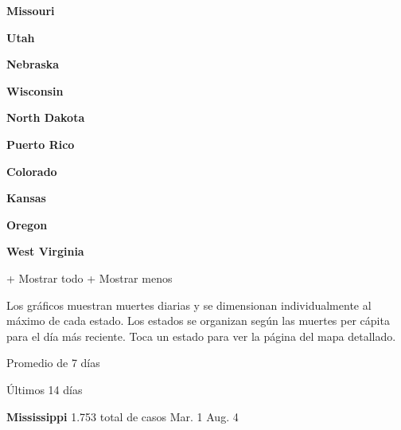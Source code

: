 \href{https://www.nytimes3xbfgragh.onion/interactive/2020/us/missouri-coronavirus-cases.html}{}

\textbf{Missouri}

\href{https://www.nytimes3xbfgragh.onion/interactive/2020/us/utah-coronavirus-cases.html}{}

\textbf{Utah}

\href{https://www.nytimes3xbfgragh.onion/interactive/2020/us/nebraska-coronavirus-cases.html}{}

\textbf{Nebraska}

\href{https://www.nytimes3xbfgragh.onion/interactive/2020/us/wisconsin-coronavirus-cases.html}{}

\textbf{Wisconsin}

\href{https://www.nytimes3xbfgragh.onion/interactive/2020/us/north-dakota-coronavirus-cases.html}{}

\textbf{North Dakota}

\href{https://www.nytimes3xbfgragh.onion/interactive/2020/us/puerto-rico-coronavirus-cases.html}{}

\textbf{Puerto Rico}

\href{https://www.nytimes3xbfgragh.onion/interactive/2020/us/colorado-coronavirus-cases.html}{}

\textbf{Colorado}

\href{https://www.nytimes3xbfgragh.onion/interactive/2020/us/kansas-coronavirus-cases.html}{}

\textbf{Kansas}

\href{https://www.nytimes3xbfgragh.onion/interactive/2020/us/oregon-coronavirus-cases.html}{}

\textbf{Oregon}

\href{https://www.nytimes3xbfgragh.onion/interactive/2020/us/west-virginia-coronavirus-cases.html}{}

\textbf{West Virginia}

+ Mostrar todo + Mostrar menos

Los gráficos muestran muertes diarias y se dimensionan individualmente
al máximo de cada estado. Los estados se organizan según las muertes per
cápita para el día más reciente. Toca un estado para ver la página del
mapa detallado.

\href{https://www.nytimes3xbfgragh.onion/interactive/2020/us/mississippi-coronavirus-cases.html}{}

Promedio de 7 días

Últimos 14 días

\textbf{Mississippi} 1.753 total de casos Mar. 1 Aug. 4

